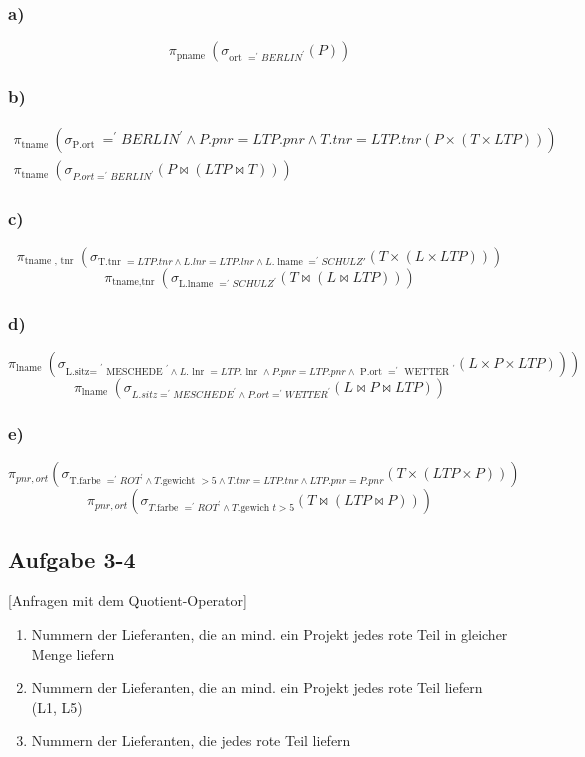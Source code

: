 \subsubsection{a)}
\[\pi_{\text {pname }}\left(\sigma_{\text {ort }=^{\prime} B E R L I N^{\prime}}(P)\right)\]
\subsubsection{b)}
$$
\begin{gathered}
\pi_{\text {tname }}\left(\sigma_{\text {P.ort }}=^{\prime} B E R L I N^{\prime} \wedge P . p n r=L T P . p n r \wedge T . t n r=L T P . t n r(P \times(T \times L T P))\right) \\
\pi_{\text {tname }}\left(\sigma_{P . o r t=^{\prime} B E R L I N^{\prime}}(P \bowtie(L T P \bowtie T))\right)
\end{gathered}
$$
\subsubsection{c)}
$$\pi_{\text {tname }, \text { tnr }}\left(\sigma_{\text {T.tnr }=L T P . t n r \wedge L . l n r=L T P . l n r \wedge L . \operatorname{lname}=^{\prime} S C H U L Z \prime}(T \times(L \times L T P))\right)$$
$$\pi_{\text {tname,tnr }}\left(\sigma_{\text {L.lname }=^{\prime} S C H U L Z^{\prime}}(T \bowtie(L \bowtie L T P))\right)$$
\subsubsection{d)}
\[    \left.\pi_{\text {lname }}\left(\sigma_{\text {L.sitz= }^{\prime} \text { MESCHEDE }^{\prime} \wedge L . \text { lnr }=L T P . \text { lnr } \wedge P . p n r=L T P . p n r \wedge\text { P.ort }=^{\prime} \text { WETTER }^{\prime}}(L \times P \times L T P)\right)\right) \]
\[   \pi_{\text {lname }}\left(\sigma_{L . s i t z=^{\prime} M E S C H E D E^{\prime} \wedge P . o r t=^{\prime} W E T T E R^{\prime}}(L \bowtie P \bowtie L T P)\right)     \]
\subsubsection{e)}
\[\pi_{p n r, o r t}\left(\sigma_{\text {T.farbe }=^{\prime} R O T^{\prime} \wedge T \text {.gewicht }>5
\wedge T . t n r=L T P . t n r \wedge L T P . p n r=P . p n r}
(T \times(L T P \times P))\right)\]
$$
\pi_{p n r, o r t}\left(\sigma_{T \text {.farbe }=^{\prime} R O T^{\prime} \wedge T \text {.gewich } t>5}(T \bowtie(L T P \bowtie P))\right)
$$
\subsection{Aufgabe 3-4}[Anfragen mit dem Quotient-Operator]
\begin{enumerate}
    \item Nummern der Lieferanten, die an mind. ein Projekt jedes rote Teil in gleicher Menge liefern
    \item Nummern der Lieferanten, die an mind. ein Projekt jedes rote Teil liefern (L1, L5)
    \item Nummern der Lieferanten, die jedes rote Teil liefern
\end{enumerate}